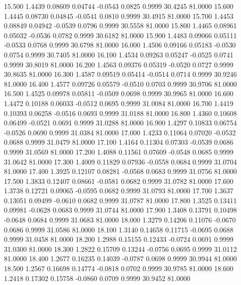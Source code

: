   15.500   1.4439   0.08609   0.04744  -0.0543   0.0825   0.9999  30.4245  81.0000
  15.600   1.4445   0.08730   0.04845  -0.0541   0.0810   0.9999  30.4915  81.0000
  15.700   1.4453   0.08849   0.04942  -0.0539   0.0796   0.9999  30.5558  81.0000
  15.800   1.4465   0.08961   0.05032  -0.0536   0.0782   0.9999  30.6182  81.0000
  15.900   1.4483   0.09066   0.05111  -0.0533   0.0768   0.9999  30.6798  81.0000
  16.000   1.4506   0.09166   0.05183  -0.0530   0.0754   0.9999  30.7405  81.0000
  16.100   1.4534   0.09263   0.05247  -0.0525   0.0741   0.9999  30.8019  81.0000
  16.200   1.4563   0.09376   0.05319  -0.0520   0.0727   0.9999  30.8635  81.0000
  16.300   1.4587   0.09519   0.05414  -0.0514   0.0714   0.9999  30.9246  81.0000
  16.400   1.4577   0.09726   0.05579  -0.0510   0.0703   0.9999  30.9706  81.0000
  16.500   1.4525   0.09978   0.05811  -0.0509   0.0698   0.9999  30.9965  81.0000
  16.600   1.4472   0.10188   0.06033  -0.0512   0.0695   0.9999  31.0084  81.0000
  16.700   1.4419   0.10393   0.06258  -0.0516   0.0693   0.9999  31.0188  81.0000
  16.800   1.4360   0.10608   0.06499  -0.0521   0.0691   0.9999  31.0288  81.0000
  16.900   1.4297   0.10833   0.06754  -0.0526   0.0690   0.9999  31.0384  81.0000
  17.000   1.4233   0.11064   0.07020  -0.0532   0.0688   0.9999  31.0479  81.0000
  17.100   1.4164   0.11304   0.07303  -0.0539   0.0686   0.9999  31.0569  81.0000
  17.200   1.4088   0.11561   0.07609  -0.0548   0.0685   0.9999  31.0642  81.0000
  17.300   1.4009   0.11829   0.07936  -0.0558   0.0684   0.9999  31.0704  81.0000
  17.400   1.3925   0.12107   0.08281  -0.0568   0.0683   0.9999  31.0756  81.0000
  17.500   1.3833   0.12407   0.08661  -0.0581   0.0682   0.9999  31.0782  81.0000
  17.600   1.3738   0.12721   0.09065  -0.0595   0.0682   0.9999  31.0793  81.0000
  17.700   1.3637   0.13051   0.09499  -0.0610   0.0682   0.9999  31.0787  81.0000
  17.800   1.3525   0.13411   0.09981  -0.0628   0.0683   0.9999  31.0744  81.0000
  17.900   1.3408   0.13791   0.10498  -0.0648   0.0684   0.9999  31.0683  81.0000
  18.000   1.3279   0.14206   0.11076  -0.0670   0.0686   0.9999  31.0586  81.0000
  18.100   1.3140   0.14658   0.11715  -0.0695   0.0688   0.9999  31.0458  81.0000
  18.200   1.2988   0.15155   0.12433  -0.0724   0.0691   0.9999  31.0300  81.0000
  18.300   1.2822   0.15709   0.13244  -0.0756   0.0695   0.9999  31.0112  81.0000
  18.400   1.2677   0.16235   0.14039  -0.0787   0.0698   0.9999  30.9944  81.0000
  18.500   1.2567   0.16698   0.14774  -0.0818   0.0702   0.9999  30.9785  81.0000
  18.600   1.2418   0.17302   0.15758  -0.0860   0.0709   0.9999  30.9452  81.0000

